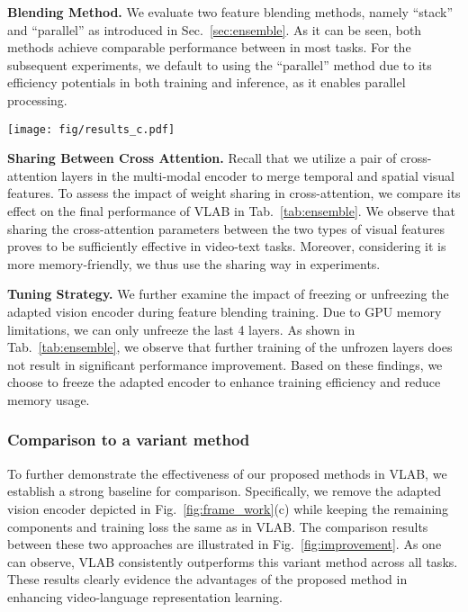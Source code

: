 \documentclass{article}
\begin{document}
\noindent\textbf{Blending Method.} We evaluate two feature blending methods, namely ``stack'' and ``parallel'' as introduced in Sec.~\ref{sec:ensemble}. As it can be seen, both methods achieve comparable performance between in most tasks. For the subsequent experiments, we default to using the ``parallel'' method due to its efficiency potentials in both training and inference, as it enables parallel processing.

\begin{figure*}[!t]
\begin{center}
\texttt{[image: fig/results\_c.pdf]}
\end{center}
   \caption{Comparison of VLAB with a well-established baseline method on three downstream tasks. ``Cap/QA/Ret'' denote the video captioning/qa/retrieval tasks respectively.}
\label{fig:improvement}
\end{figure*}

\noindent\textbf{Sharing Between Cross Attention.}
Recall that we utilize a pair of cross-attention layers in the multi-modal encoder to merge temporal and spatial visual features. To assess the impact of weight sharing in cross-attention, we compare its effect on the final performance of VLAB in Tab.~\ref{tab:ensemble}. We observe that sharing the cross-attention parameters between the two types of visual features proves to be sufficiently effective in video-text tasks. Moreover, considering it is more memory-friendly, we thus use the sharing way in experiments.

\noindent\textbf{Tuning Strategy.} 
We further examine the impact of freezing or unfreezing the adapted vision encoder during feature blending training. Due to GPU memory limitations, we can only unfreeze the last 4 layers. As shown in Tab.~\ref{tab:ensemble}, we observe that further training of the unfrozen layers does not result in significant performance improvement. Based on these findings, we choose to freeze the adapted encoder to enhance training efficiency and reduce memory usage.


\subsubsection{Comparison to a variant method}

To further demonstrate the effectiveness of our proposed methods in VLAB, we establish a strong baseline for comparison. Specifically, we remove the adapted vision encoder depicted in Fig.~\ref{fig:frame_work}(c) while keeping the remaining components and training loss the same as in VLAB. The comparison results between these two approaches are illustrated in Fig.~\ref{fig:improvement}. As one can observe, VLAB consistently outperforms this variant method across all tasks. These results clearly evidence the advantages of the proposed method in enhancing video-language representation learning.
\end{document}
